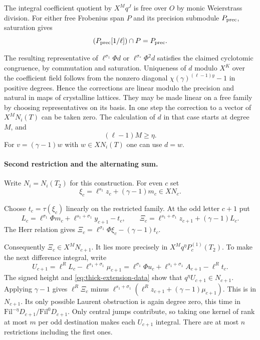 The integral coefficient quotient by \(X^Mq^J\) is free
over \(O\) by monic Weierstrass division. For either free Frobenius span \(P\) and its precision submodule \(P_{\rm prec}\), saturation gives
\[
 (P_{\rm prec}[1/\ell])\cap P=P_{\rm prec}.
\]

The resulting representative of \(\ell^{\sigma_1}\Phi d\)
or \(\ell^{\sigma_*}\Phi^2d\) satisfies the claimed
cyclotomic congruence, by commutation and saturation.
Uniqueness of \(d\) modulo \(X^K\) over the coefficient field
follows from the nonzero diagonal \(\chi(\gamma)^{(\ell-1)y}-1\)
in positive degrees. Hence the corrections are linear modulo
the precision and natural in maps of crystalline lattices.
They may be made linear on a free family by choosing
representatives on its basis. In one step the correction to a
vector of \(X^MN_i(T)\) can be taken zero. The calculation of
\(d\) in that case starts at degree \(M\), and
\[
 (\ell-1)M\ge\eta.
\]
For \(v=(\gamma-1)w\) with
\(w\in XN_i(T)\) one can use \(d=w\).

\paragraph{Second restriction and the alternating sum.}
Write \(N_i=N_i(T_2)\) for this construction. For even \(c\)
set
\[
 \xi_c=\ell^{s_1}z_c+(\gamma-1)m_c\in XN_c.
\]

Choose \(t_c=\tau(\xi_c)\) linearly on the restricted family.
At the odd letter \(c+1\) put
\[
 L_c=\ell^{\sigma_1}\Phi m_c+
             \ell^{s_1+\sigma_1}y_{c+1}-t_c,\qquad
 \Xi_c=\ell^{s_1+\sigma_1}z_{c+1}+(\gamma-1)L_c .
\]
The Herr relation gives
\(\Xi_c=\ell^{\sigma_1}\Phi\xi_c-(\gamma-1)t_c\).

Consequently \(\Xi_c\in X^MN_{c+1}\). It lies more precisely
in \(X^Mq^\eta P_c^{(1)}(T_2)\).
To make the next difference integral, write
\[
 U_{c+1}=\ell^R L_c-\ell^{s_1+\sigma_1}\mu_{c+1}
        =\ell^{\sigma_1}\Phi u_c+\ell^{s_1+\sigma_1}A_{c+1}
           -\ell^R t_c .
\]
The signed height and \eqref{eq:thick-extension-data} show that \(q^\eta U_{c+1}\in N_{c+1}\).
Applying \(\gamma-1\) gives \(\ell^R\Xi_c\) minus
\(\ell^{s_1+\sigma_1}(\ell^R z_{c+1}+(\gamma-1)\mu_{c+1})\).
This is in \(N_{c+1}\). Its only possible Laurent obstruction
is again degree zero, this time in
\(\mathrm{Fil}^{-\eta}D_{c+1}/\mathrm{Fil}^0D_{c+1}\).
Only central jumps contribute, so taking one kernel of rank
at most \(m\) per odd destination makes each \(U_{c+1}\) integral.
There are at most \(n\) restrictions including the first ones.

